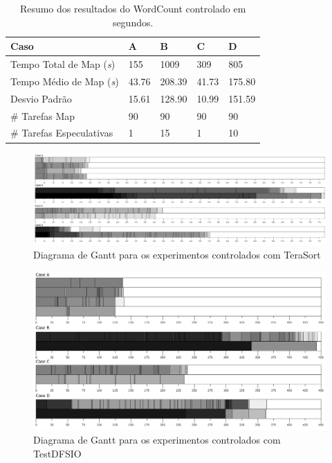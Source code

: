 \begin{table}[h!]
	\caption{Resumo dos resultados do WordCount controlado em segundos.} \label{tab:exp1WC}
	\begin{tabular*}{\hsize}{lllll} %
		\textbf{Caso} & \textbf{A} & \textbf{B} & \textbf{C} & \textbf{D}\\
		\hline
		Tempo Total de Map ({\it{s}}) & 155 & 1009 & 309 & 805 \\
		Tempo Médio de Map ({\it{s}}) & 43.76 & 208.39 & 41.73 & 175.80 \\
		Desvio Padrão & 15.61 & 128.90 & 10.99 & 151.59 \\
		\# Tarefas Map & 90 & 90 & 90 & 90 \\
		\# Tarefas Especulativas & 1 & 15 & 1 & 10 \\
	\end{tabular*}
\end{table}

\begin{figure}[!ht]
	\centering
	\includegraphics[width=1\textwidth]{figuras/todos.png}
	\caption{Diagrama de Gantt para os experimentos controlados com TeraSort}
	\label{fig:exp1TS}
\end{figure}

\begin{figure}[!ht]
	\centering
	\includegraphics[width=1\textwidth]{figuras/todos-DFSIO.png}
	\caption{Diagrama de Gantt para os experimentos controlados com TestDFSIO}
	\label{fig:exp1IO}
\end{figure}

